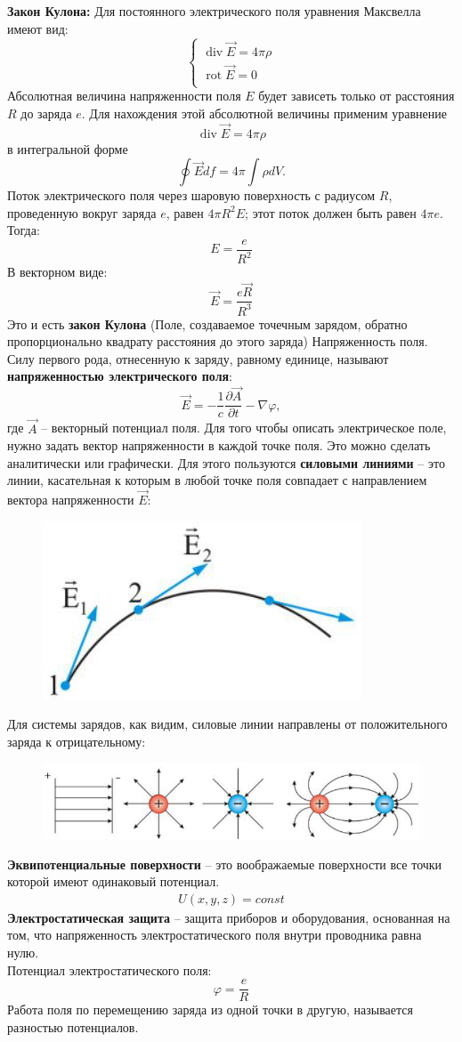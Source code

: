 \documentclass[__minimum__.tex]{subfiles}
\begin{document}
\textbf{Закон Кулона:} Для постоянного электрического поля уравнения Максвелла имеют вид:
$$
\begin{cases}
\operatorname{div}\vec{E} = 4 \pi \rho\\
\operatorname{rot}\vec{E} = 0\\
\end{cases}
$$
Абсолютная величина напряженности поля $E$ будет зависеть только от расстояния $R$ до заряда $e$. Для нахождения этой абсолютной величины применим уравнение
$$
    \operatorname{div}\vec{E}=4\pi\rho
$$
в интегральной форме
$$
    \oint\vec{E}df=4\pi\int\rho dV.
$$
Поток электрического поля через шаровую поверхность с радиусом $R$, проведенную вокруг заряда $e$, равен $4\pi R^2 E$; этот поток должен быть равен $4\pi e$. Тогда:
$$
    E=\frac{e}{R^2}
$$
В векторном виде:
$$
    \vec{E}=\frac{e \vec{R}}{R^3}
$$
Это и есть \textbf{закон Кулона} (Поле, создаваемое точечным зарядом, обратно пропорционально квадрату расстояния до этого заряда)
Напряженность поля. Силу первого рода, отнесенную к заряду, равному единице, называют \textbf{напряженностью электрического поля}:\\
$$
    \vec{E} = -\frac{1}{c}\frac{\partial \vec{A}}{\partial t}-\nabla\varphi,
$$
где $\vec{A}$ -- векторный потенциал поля. Для того чтобы описать электрическое поле, нужно задать вектор напряженности в каждой точке поля. Это можно сделать аналитически или графически. Для этого пользуются \textbf{силовыми линиями} -- это линии, касательная к которым в любой точке поля совпадает с направлением вектора напряженности $\vec{E}$:
\begin{figure}[h]
\centering
\includegraphics[width=.4\linewidth]{img/С-03_1.jpg}
\end{figure}
Для системы зарядов, как видим, силовые линии направлены от положительного заряда к отрицательному:
\begin{figure}[h]
\centering
\includegraphics[width=.4\linewidth]{img/С-03_2.jpg}
\end{figure}
\textbf{Эквипотенциальные поверхности} -- это воображаемые поверхности все точки которой имеют одинаковый потенциал.
\begin{gather*}
    U(x,y,z) = const
\end{gather*}
\textbf{Электростатическая защита} -- защита приборов и оборудования, основанная на том, что напряженность электростатического поля внутри проводника равна нулю.\\
Потенциал электростатического поля:
$$
    \varphi=\frac{e}{R}
$$
Работа поля по перемещению заряда из одной точки в другую, называется разностью потенциалов.\\
\end{document}
